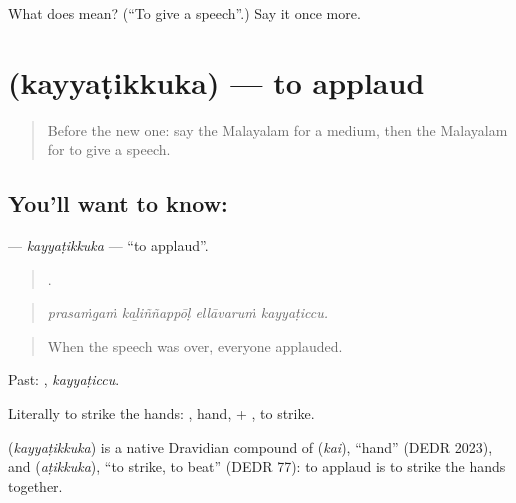 \begin{tcolorbox}[breakable,colback=teal!4,colframe=teal!35!black,title={Before you move on}]
What does  mean? (\textquotedblleft{}To give a speech\textquotedblright{}.) Say it once more.
\end{tcolorbox}
\section[\texorpdfstring{\ml{കയ്യടിക്കുക} (kayyaṭikkuka)}{കയ്യടിക്കുക (kayyaṭikkuka)}]{ (kayyaṭikkuka) — to applaud}

\label{lesson:ML-C354-kayyatikkuka}



\begin{quote}
Before the new one: say the Malayalam for a medium, then the Malayalam for to give a speech.
\end{quote}

\subsection*{You'll want to know: }
\textbf{} — \emph{kayyaṭikkuka} — \textquotedblleft{}to applaud\textquotedblright{}.

\begin{quote}
   .
\end{quote}

\begin{quote}
\emph{prasaṁgaṁ kaḻiññappōḷ ellāvaruṁ kayyaṭiccu.}
\end{quote}

\begin{quote}
When the speech was over, everyone applauded.
\end{quote}

Past: , \emph{kayyaṭiccu}.

Literally to strike the hands: , hand, + , to strike.

\begin{cousinweb}
\textbf{} (\emph{kayyaṭikkuka}) is a native Dravidian compound of  (\emph{kai}), \textquotedblleft{}hand\textquotedblright{} (DEDR 2023), and  (\emph{aṭikkuka}), \textquotedblleft{}to strike, to beat\textquotedblright{} (DEDR 77): to applaud is to strike the hands together.
\end{cousinweb}

